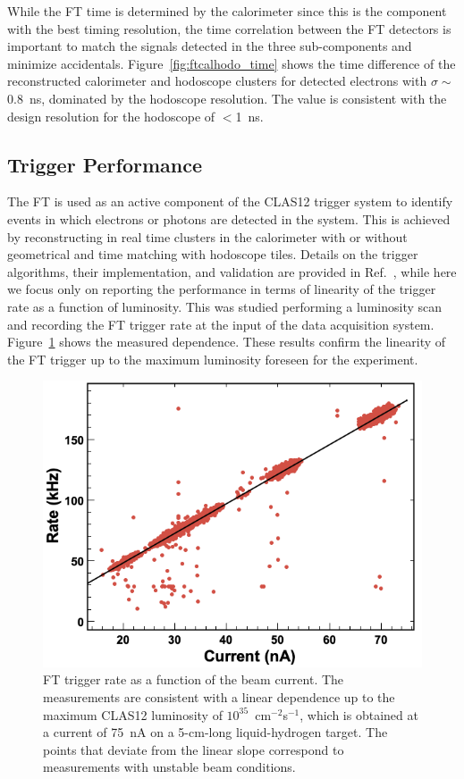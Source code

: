 While the FT time is determined by the calorimeter since this is the component with the best timing resolution,
the time correlation between the FT detectors is important to match the signals detected in the three
sub-components and minimize accidentals. Figure~\ref{fig:ftcalhodo_time} shows the time difference of the
reconstructed calorimeter and hodoscope clusters for detected electrons with $\sigma \sim$0.8~ns,
dominated by the hodoscope resolution. The value is consistent with the design resolution for the hodoscope of
$<$1~ns.

\subsection{Trigger Performance}

The FT is used as an active component of the CLAS12 trigger system to identify events in which electrons or
photons are detected in the system. This is achieved by reconstructing in real time clusters in the calorimeter with
or without geometrical and time matching with hodoscope tiles. Details on the trigger algorithms, their implementation,
and validation are provided in Ref.~\cite{trigger}, while here we focus only on reporting the performance in terms of
linearity of the trigger rate as a function of luminosity. This was studied performing a luminosity scan and recording
the FT trigger rate at the input of the data acquisition system. Figure~\ref{fig:trigger_rate} shows the measured
dependence. These results confirm the linearity of the FT trigger up to the maximum luminosity foreseen for the
experiment.

\begin{figure}[h]
\includegraphics[height=0.68\columnwidth]{fig/ft_trigger.png}
\caption{FT trigger rate as a function of the beam current. The measurements are consistent with a linear dependence
  up to the maximum CLAS12 luminosity of $10^{35}$~cm$^{-2}$s$^{-1}$, which is obtained at a current of 75~nA on a
  5-cm-long liquid-hydrogen target. The points that deviate from the linear slope correspond to measurements with
  unstable beam conditions.}
\label{fig:trigger_rate}
\end{figure}

